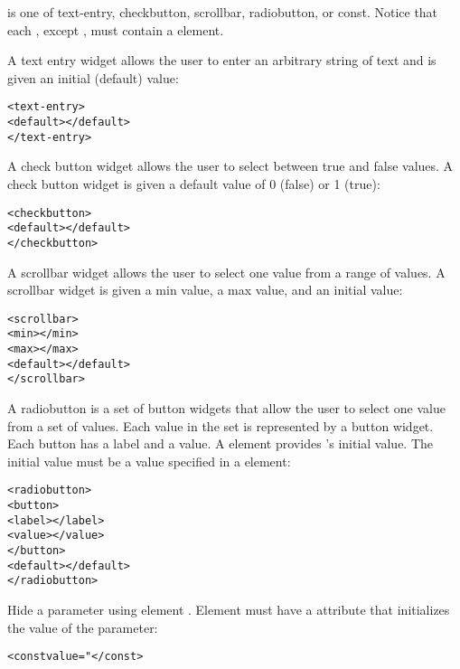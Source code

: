  is one of text-entry, checkbutton,
scrollbar, radiobutton, or const. Notice that each
, except , must
contain a  element.

A text entry widget allows the user to enter an arbitrary string of text
and is given an initial (default) value:

\begin{alltt}
  <text-entry>
    <default></default>
  </text-entry>
\end{alltt}

A check button widget allows the user to select between true and false
values.  A check button widget is given a default value of 0 (false)
or 1 (true):

\begin{alltt}
  <checkbutton>
    <default></default>
  </checkbutton>
\end{alltt}

A scrollbar widget allows the user to select one value from a
range of values.  A scrollbar widget is given a min value, a max
value, and an initial value:

\begin{alltt}
  <scrollbar>
    <min></min>
    <max></max>
    <default></default>
  </scrollbar>
\end{alltt}

A radiobutton is a set of button widgets that allow the user to select
one value from a set of values.  Each value in the set is represented
by a button widget.  Each button has a label and a value.  A
 element provides 's
initial value.  The initial value must be a value specified in a
 element:

\begin{alltt}
  <radiobutton>
    <button>
      <label></label>
      <value></value>
    </button>
    \velide  
    <default></default>
  </radiobutton>
\end{alltt}

Hide a parameter using element .  Element
 must have a  attribute that
initializes the value of the parameter:

\begin{alltt}
  <const value="</const>
\end{alltt}

